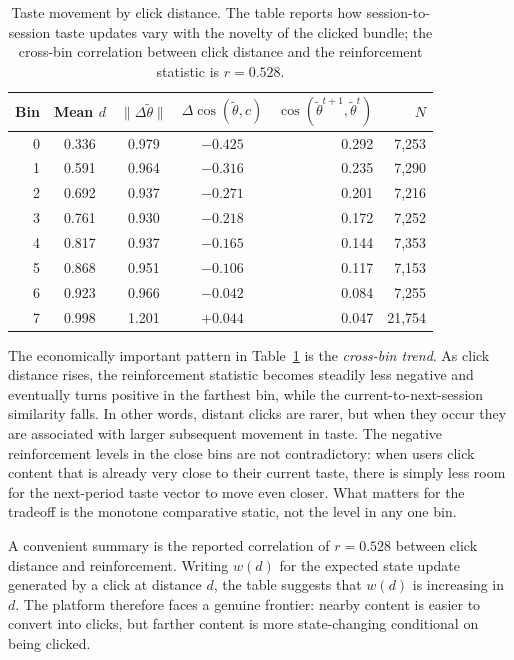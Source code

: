 \documentclass[11pt]{article}
\begin{document}
\begin{table}[ht]
\centering
\caption{Taste movement by click distance. The table reports how session-to-session taste updates vary with the novelty of the clicked bundle; the cross-bin correlation between click distance and the reinforcement statistic is $r = 0.528$.}
\label{tab:movement}
\small
\begin{tabular}{rcccrr}
\toprule
Bin & Mean $d$ & $\|\Delta\tilde{\theta}\|$ & $\Delta\cos(\tilde{\theta},c)$ & $\cos(\tilde{\theta}^{t+1},\tilde{\theta}^{t})$ & $N$ \\
\midrule
0 & 0.336 & 0.979 & $-0.425$ & 0.292 & 7,253 \\
1 & 0.591 & 0.964 & $-0.316$ & 0.235 & 7,290 \\
2 & 0.692 & 0.937 & $-0.271$ & 0.201 & 7,216 \\
3 & 0.761 & 0.930 & $-0.218$ & 0.172 & 7,252 \\
4 & 0.817 & 0.937 & $-0.165$ & 0.144 & 7,353 \\
5 & 0.868 & 0.951 & $-0.106$ & 0.117 & 7,153 \\
6 & 0.923 & 0.966 & $-0.042$ & 0.084 & 7,255 \\
7 & 0.998 & 1.201 & $+0.044$ & 0.047 & 21,754 \\
\bottomrule
\end{tabular}
\end{table}
\FloatBarrier

The economically important pattern in Table~\ref{tab:movement} is the \emph{cross-bin trend}. As click distance rises, the reinforcement statistic becomes steadily less negative and eventually turns positive in the farthest bin, while the current-to-next-session similarity falls. In other words, distant clicks are rarer, but when they occur they are associated with larger subsequent movement in taste. The negative reinforcement levels in the close bins are not contradictory: when users click content that is already very close to their current taste, there is simply less room for the next-period taste vector to move even closer. What matters for the tradeoff is the monotone comparative static, not the level in any one bin.

A convenient summary is the reported correlation of $r = 0.528$ between click distance and reinforcement. Writing $w(d)$ for the expected state update generated by a click at distance $d$, the table suggests that $w(d)$ is increasing in $d$. The platform therefore faces a genuine frontier: nearby content is easier to convert into clicks, but farther content is more state-changing conditional on being clicked.
\end{document}
